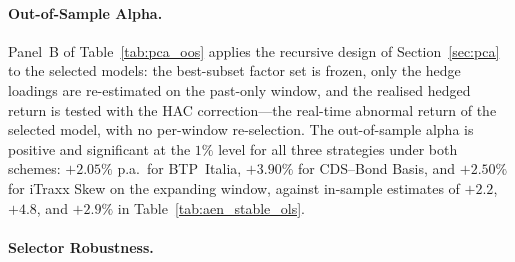 \paragraph{Out-of-Sample Alpha.}

Panel~B of Table~\ref{tab:pca_oos} applies the recursive design of
Section~\ref{sec:pca} to the selected models: the best-subset factor
set is frozen, only the hedge loadings are re-estimated on the
past-only window, and the realised hedged return is tested with the
HAC correction---the real-time abnormal return of the selected model,
with no per-window re-selection. The out-of-sample alpha is positive
and significant at the $1\%$ level for all three strategies under
both schemes: $+2.05\%$ p.a.\ for BTP~Italia, $+3.90\%$ for
CDS--Bond Basis, and $+2.50\%$ for iTraxx Skew on the expanding
window, against in-sample estimates of $+2.2$, $+4.8$, and $+2.9\%$
in Table~\ref{tab:aen_stable_ols}.

\paragraph{Selector Robustness.}

